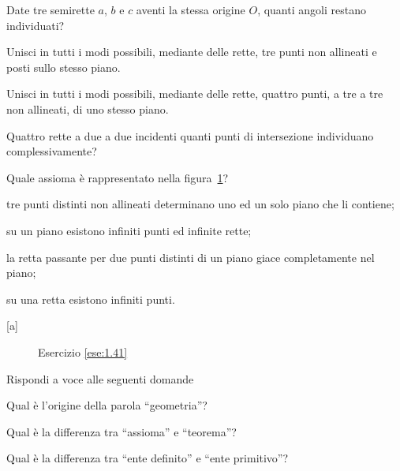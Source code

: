 \begin{esercizio}
\label{ese:1.37}
Date tre semirette $a$, $b$ e $c$ aventi la stessa origine $O$, 
quanti angoli restano individuati?
\end{esercizio}

\begin{esercizio}
\label{ese:1.38}
Unisci in tutti i modi possibili, mediante delle rette, tre punti non 
allineati e posti sullo stesso piano.
\end{esercizio}

\begin{esercizio}
\label{ese:1.39}
Unisci in tutti i modi possibili, mediante delle rette, quattro 
punti, a tre a tre non allineati, di uno stesso piano.
\end{esercizio}

\begin{esercizio}
\label{ese:1.40}
Quattro rette a due a due incidenti quanti punti di intersezione 
individuano complessivamente?
\end{esercizio}

\begin{esercizio}
\label{ese:1.41}
Quale assioma è rappresentato nella figura~\ref{fig:ese1.41}?
\begin{enumeratea}
\item tre punti distinti non allineati determinano uno ed un solo 
piano che li contiene;
\item su un piano esistono infiniti punti ed infinite rette;
\item la retta passante per due punti distinti di un piano giace 
completamente nel piano;
\item su una retta esistono infiniti punti.
\end{enumeratea}
\hfill[a]
\end{esercizio}


\begin{inaccessibleblock}
 \begin{figure}[htb]
 \centering
 \caption{Esercizio \ref{ese:1.41}}\label{fig:ese1.41}
\end{figure}
\end{inaccessibleblock}

\begin{esercizio}
\label{ese:1.42}
Rispondi a voce alle seguenti domande
\begin{enumeratea}
\item Qual è l'origine della parola ``geometria''?
\item Qual è la differenza tra ``assioma'' e ``teorema''?
\item Qual è la differenza tra ``ente definito'' e ``ente primitivo''?
\end{enumeratea}
\end{esercizio}

